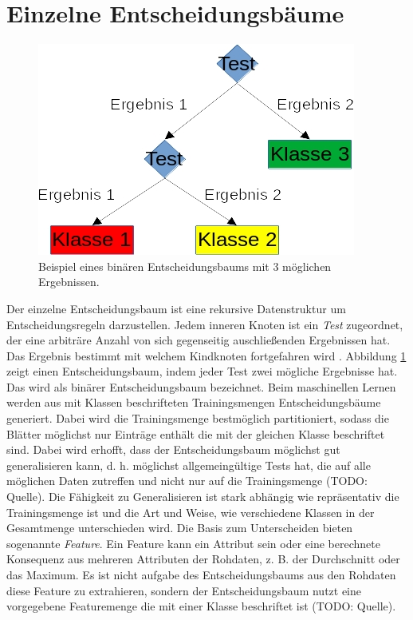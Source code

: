 \section{Einzelne Entscheidungsbäume}
\label{sec:construction}
\begin{figure}
    \centering
    \includegraphics[width=0.5\linewidth]{images/entscheidungsbaum.jpg}
    \caption{Beispiel eines binären Entscheidungsbaums mit 3 möglichen Ergebnissen.}
    \label{fig:entscheidungsbaum}
\end{figure}
Der einzelne Entscheidungsbaum ist eine rekursive Datenstruktur um Entscheidungsregeln darzustellen. Jedem inneren Knoten ist ein \textit{Test} zugeordnet, der eine arbiträre Anzahl von sich gegenseitig
auschließenden Ergebnissen hat. Das Ergebnis bestimmt mit welchem Kindknoten fortgefahren wird \cite{quinlan1990decision}. Abbildung \ref{fig:entscheidungsbaum} zeigt einen Entscheidungsbaum, indem jeder Test
zwei mögliche Ergebnisse hat. Das wird als binärer Entscheidungsbaum bezeichnet.
\newline
\newline
Beim maschinellen Lernen werden aus mit Klassen beschrifteten Trainingsmengen Entscheidungsbäume generiert. Dabei wird die Trainingsmenge bestmöglich partitioniert, sodass die Blätter möglichst nur Einträge
enthält die mit der gleichen Klasse beschriftet sind. Dabei wird erhofft, dass der Entscheidungsbaum möglichst gut generalisieren kann, d. h. möglichst allgemeingültige Tests hat, die auf alle möglichen
Daten zutreffen und nicht nur auf die Trainingsmenge (TODO: Quelle).
\newline
\newline
Die Fähigkeit zu Generalisieren ist stark abhängig wie repräsentativ die Trainingsmenge ist und die Art und Weise, wie verschiedene Klassen in der Gesamtmenge unterschieden wird. Die Basis zum
Unterscheiden bieten sogenannte \textit{Feature}. Ein Feature kann ein Attribut sein oder eine berechnete Konsequenz aus mehreren Attributen der Rohdaten, z. B. der Durchschnitt oder das Maximum. Es ist
nicht aufgabe des Entscheidungsbaums aus den Rohdaten diese Feature zu extrahieren, sondern der Entscheidungsbaum nutzt eine vorgegebene Featuremenge die mit einer Klasse beschriftet ist (TODO: Quelle).
